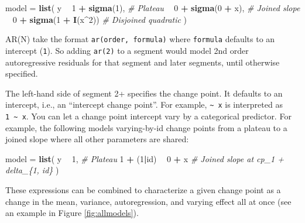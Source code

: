 \documentclass[
  american,
]{article}
\newenvironment{Shaded}{\begin{snugshade}}{\end{snugshade}}
\newcommand{\CommentTok}[1]{\textcolor[rgb]{0.56,0.35,0.01}{\textit{#1}}}
\newcommand{\DecValTok}[1]{\textcolor[rgb]{0.00,0.00,0.81}{#1}}
\newcommand{\KeywordTok}[1]{\textcolor[rgb]{0.13,0.29,0.53}{\textbf{#1}}}
\newcommand{\NormalTok}[1]{#1}
\newcommand{\OperatorTok}[1]{\textcolor[rgb]{0.81,0.36,0.00}{\textbf{#1}}}
\newcommand{\StringTok}[1]{\textcolor[rgb]{0.31,0.60,0.02}{#1}}
\begin{document}
\begin{Shaded}
\begin{Highlighting}[]
\NormalTok{model =}\StringTok{ }\KeywordTok{list}\NormalTok{(}
\NormalTok{  y }\OperatorTok{~}\StringTok{ }\DecValTok{1} \OperatorTok{+}\StringTok{ }\KeywordTok{sigma}\NormalTok{(}\DecValTok{1}\NormalTok{),         }\CommentTok{# Plateau}
    \OperatorTok{~}\StringTok{ }\DecValTok{0} \OperatorTok{+}\StringTok{ }\KeywordTok{sigma}\NormalTok{(}\DecValTok{0} \OperatorTok{+}\StringTok{ }\NormalTok{x),     }\CommentTok{# Joined slope}
    \OperatorTok{~}\StringTok{ }\DecValTok{0} \OperatorTok{+}\StringTok{ }\KeywordTok{sigma}\NormalTok{(}\DecValTok{1} \OperatorTok{+}\StringTok{ }\KeywordTok{I}\NormalTok{(x}\OperatorTok{^}\DecValTok{2}\NormalTok{)) }\CommentTok{# Disjoined quadratic}
\NormalTok{)}
\end{Highlighting}
\end{Shaded}

AR(N) take the format \texttt{ar(order,\ formula)} where \texttt{formula} defaults to an intercept (\texttt{1}). So adding \texttt{ar(2)} to a segment would model 2nd order autoregressive residuals for that segment and later segments, until otherwise specified.

The left-hand side of segment 2+ specifies the change point. It defaults to an intercept, i.e., an ``intercept change point''. For example, \texttt{\textasciitilde{}\ x} is interpreted as \texttt{1\ \textasciitilde{}\ x}. You can let a change point intercept vary by a categorical predictor. For example, the following models varying-by-id change points from a plateau to a joined slope where all other parameters are shared:

\begin{Shaded}
\begin{Highlighting}[]
\NormalTok{model =}\StringTok{ }\KeywordTok{list}\NormalTok{(}
\NormalTok{  y }\OperatorTok{~}\StringTok{ }\DecValTok{1}\NormalTok{,              }\CommentTok{# Plateau}
  \DecValTok{1} \OperatorTok{+}\StringTok{ }\NormalTok{(}\DecValTok{1}\OperatorTok{|}\NormalTok{id) }\OperatorTok{~}\StringTok{ }\DecValTok{0} \OperatorTok{+}\StringTok{ }\NormalTok{x  }\CommentTok{# Joined slope at cp_1 + delta_\{1, id\}}
\NormalTok{)}
\end{Highlighting}
\end{Shaded}

These expressions can be combined to characterize a given change point as a change in the mean, variance, autoregression, and varying effect all at once (see an example in Figure \ref{fig:allmodels}).
\end{document}
